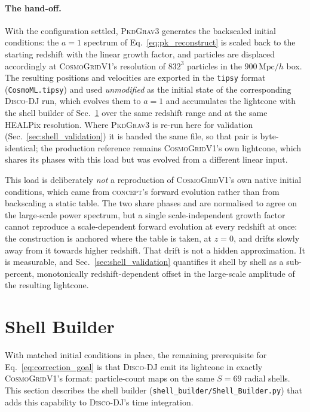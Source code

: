 \documentclass{report}
\begin{document}
\paragraph{The hand-off.} With the configuration settled, \textsc{PkdGrav3} generates the
backscaled initial conditions: the $a=1$ spectrum of Eq.~\eqref{eq:pk_reconstruct} is
scaled back to the starting redshift with the linear growth factor, and particles are
displaced accordingly at \textsc{CosmoGridV1}'s resolution of $832^3$ particles in the
$900\,\mathrm{Mpc}/h$ box. The resulting positions and velocities are exported in the
\texttt{tipsy} format (\texttt{CosmoML.tipsy}) and used \emph{unmodified} as the initial
state of the corresponding \textsc{Disco-DJ} run, which evolves them to $a=1$ and accumulates
the lightcone with the shell builder of Sec.~\ref{sec:shell_builder} over the same
redshift range and at the same HEALPix resolution. Where \textsc{PkdGrav3} is re-run here for validation (Sec.~\ref{sec:shell_validation}) it is handed the same file, so that pair is byte-identical; the production reference remains \textsc{CosmoGridV1}'s own lightcone, which shares its phases with this load but was evolved from a different linear input.

This load is deliberately \emph{not} a reproduction of \textsc{CosmoGridV1}'s own native initial conditions, which came from \textsc{concept}'s forward evolution rather than from backscaling a static table. The two share phases and are normalised to agree on the large-scale power spectrum, but a single scale-independent growth factor cannot reproduce a scale-dependent forward evolution at every redshift at once: the construction is anchored where the table is taken, at $z=0$, and drifts slowly away from it towards higher redshift. That drift is not a hidden approximation. It is
measurable, and Sec.~\ref{sec:shell_validation} quantifies it shell by shell as a sub-percent, monotonically redshift-dependent offset in the large-scale amplitude of the resulting lightcone.

\section{Shell Builder}
\label{sec:shell_builder}

With matched initial conditions in place, the remaining prerequisite for Eq.~\eqref{eq:correction_goal} is that \textsc{Disco-DJ} emit its lightcone in exactly \textsc{CosmoGridV1}'s format: particle-count maps on the same $S=69$ radial shells. This section describes the shell builder (\texttt{shell\_builder/Shell\_Builder.py}) that adds this capability to \textsc{Disco-DJ}'s time integration.
\end{document}
